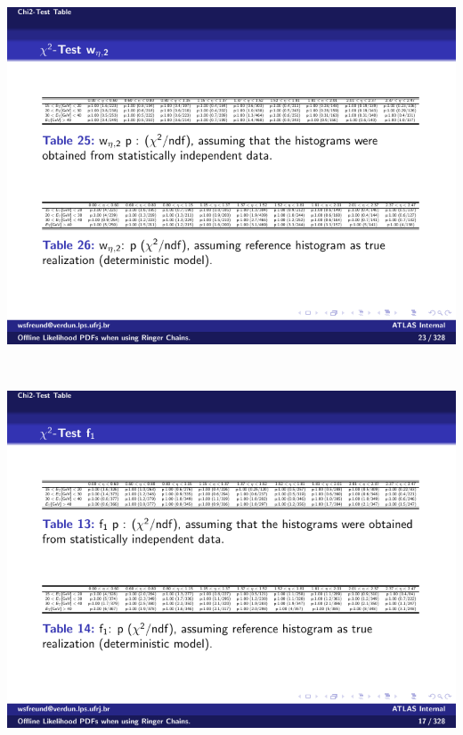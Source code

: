 \begin{table}[p]
\begin{subtable}{\textwidth}
\caption{\weta{}\label{tab:gof_chi2_p_values_weta}}
\includegraphics[width=\textwidth]{appendices/figures/gof/weta2_chi2_table.pdf}
\end{subtable} \\
\begin{subtable}{\textwidth}
\caption{\fI{}\label{tab:gof_chi2_p_values_f1}}
\includegraphics[width=\textwidth]{appendices/figures/gof/f1_chi2_table.pdf}
\end{subtable} \\
\begin{subtable}{\textwidth}
\caption{\fIII{}\label{tab:gof_chi2_p_values_f3}}

\end{subtable}
\end{table}
